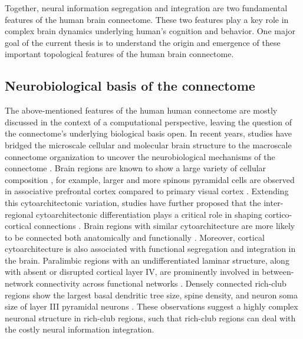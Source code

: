 \begin{refsection}
Together, neural information segregation and integration are two fundamental features of the human brain connectome. These two features play a key role in complex brain dynamics underlying human's cognition and behavior. One major goal of the current thesis is to understand the origin and emergence of these important topological features of the human brain connectome.

\subsection*{Neurobiological basis of the connectome}
The above-mentioned features of the human human connectome are mostly discussed in the context of a computational perspective, leaving the question of the connectome's underlying biological basis open. In recent years, studies have bridged the microscale cellular and molecular brain structure to the macroscale connectome organization to uncover the neurobiological mechanisms of the connectome \citep{Scholtens2018MultimodalCI,Heuvel2019MultiscaleNO}. Brain regions are known to show a large variety of cellular composition \citep{brodmann1909vergleichende,von1925cytoarchitektonik}, for example, larger and more spinous pyramidal cells are observed in associative prefrontal cortex compared to primary visual cortex \citep{elston2001pyramidal,elston2003cortex}. Extending this cytoarchitectonic variation, studies have further proposed that the inter-regional cytoarchitectonic differentiation plays a critical role in shaping cortico-cortical connections \citep{barbas2015general}. Brain regions with similar cytoarchitecture are more likely to be connected both anatomically and functionally \citep{barbas2015general,beul2015predictive,beul2017predictive,goulas2017principles}. Moreover, cortical cytoarchitecture is also associated with functional segregation and integration in the brain. Paralimbic regions with an undifferentiated laminar structure, along with absent or disrupted cortical layer IV, are prominently involved in between-network connectivity across functional networks \citep{Wylie2015BetweennetworkCO}. Densely connected rich-club regions show the largest basal dendritic tree size, spine density, and neuron soma size of layer III pyramidal neurons \citep{scholtens2014linking,Heuvel2015BridgingCA,VANDENHEUVEL2016293}. These observations suggest a highly complex neuronal structure in rich-club regions, such that rich-club regions can deal with the costly neural information integration. 


\end{refsection}
